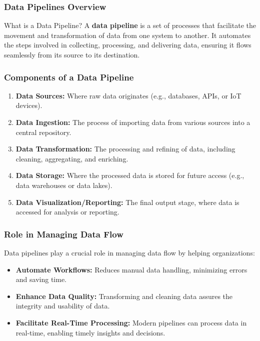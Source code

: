 \documentclass[aspectratio=169]{beamer}
\begin{document}
\begin{frame}[fragile]
    \frametitle{Data Pipelines Overview}
    \begin{block}{What is a Data Pipeline?}
        A \textbf{data pipeline} is a set of processes that facilitate the movement and transformation of data from one system to another. It automates the steps involved in collecting, processing, and delivering data, ensuring it flows seamlessly from its source to its destination.
    \end{block}
\end{frame}

\begin{frame}[fragile]
    \frametitle{Components of a Data Pipeline}
    \begin{enumerate}
        \item \textbf{Data Sources:} Where raw data originates (e.g., databases, APIs, or IoT devices).
        \item \textbf{Data Ingestion:} The process of importing data from various sources into a central repository.
        \item \textbf{Data Transformation:} The processing and refining of data, including cleaning, aggregating, and enriching.
        \item \textbf{Data Storage:} Where the processed data is stored for future access (e.g., data warehouses or data lakes).
        \item \textbf{Data Visualization/Reporting:} The final output stage, where data is accessed for analysis or reporting.
    \end{enumerate}
\end{frame}

\begin{frame}[fragile]
    \frametitle{Role in Managing Data Flow}
    Data pipelines play a crucial role in managing data flow by helping organizations:
    \begin{itemize}
        \item \textbf{Automate Workflows:} Reduces manual data handling, minimizing errors and saving time.
        \item \textbf{Enhance Data Quality:} Transforming and cleaning data assures the integrity and usability of data.
        \item \textbf{Facilitate Real-Time Processing:} Modern pipelines can process data in real-time, enabling timely insights and decisions.
    \end{itemize}
\end{frame}
\end{document}
